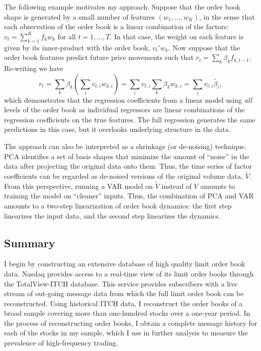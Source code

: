 	The following example motivates my approach. Suppose that the order book shape is generated by a small number of features $(w_1, \dots, w_K)$, in the sense that each observation of the order book is a linear combination of the factors: $v_t = \sum_{k=1}^K f_k w_k$ for all $t = 1, \dots, T$. In that case, the weight on each feature is given by its inner-product with the order book, $v_t'w_k$. Now suppose that the order book features predict future price movements such that $r_t = \sum_k \beta_k f_{k, t - 1}.$ Re-writing we have
	\begin{equation}
		r_t = \sum_k \beta_k \left( \sum_i v_{t, i} w_{k, i} \right) = \sum_i v_{t,i} \sum_k \beta_k w_{k, i} = \sum_i v_{t,i} \tilde{\beta_i},
	\end{equation}
	which demonstrates that the regression coefficients from a linear model using \textit{all} levels of the order book as individual regressors are linear combinations of the regression coefficients on the true features. The full regression generates the same predictions in this case, but it overlooks underlying structure in the data.

	The approach can also be interpreted as a shrinkage (or de-noising) technique. PCA identifies a set of basis shapes that minimize the amount of ``noise'' in the data after projecting the original data onto them. Thus, the time series of factor coefficients can be regarded as de-noised versions of the original volume data, $\tilde{V}$. From this perspective, running a VAR model on $\tilde{V}$ instead of $V$ amounts to training the model on ``cleaner'' inputs. Thus, the combination of PCA and VAR amounts to a two-step linearization of order book dynamics: the first step linearizes the input data, and the second step linearizes the dynamics.

	\subsection{Summary}
		I begin by constructing an extensive database of high quality limit order book data. Nasdaq provides access to a real-time view of its limit order books through the TotalView-ITCH database. This service provides subscribers with a live stream of out-going message data from which the full limit order book can be reconstructed. Using historical ITCH data, I reconstruct the order books of a broad sample covering more than one-hundred stocks over a one-year period. In the process of reconstructing order books, I obtain a complete message history for each of the stocks in my sample, which I use in further analysis to measure the prevalence of high-frequency trading.

